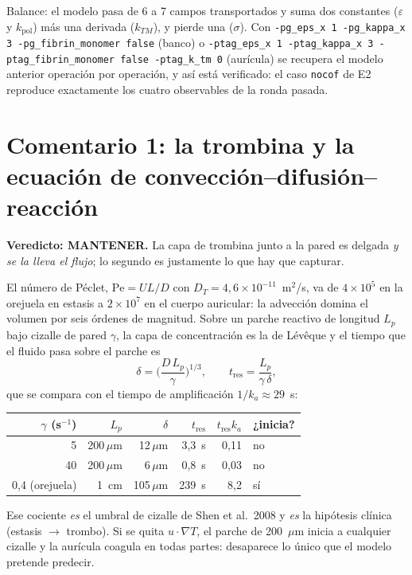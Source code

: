 \documentclass[11pt,a4paper]{article}
\newcommand{\MANT}{\textcolor{keep}{\textbf{MANTENER}}}
\begin{document}
\noindent
Balance: el modelo pasa de 6 a 7 campos transportados y suma dos constantes
($\varepsilon$ y $k_{\mathrm{pol}}$) más una derivada ($k_{TM}$), y pierde una
($\sigma$). Con
\verb|-pg_eps_x 1 -pg_kappa_x 3 -pg_fibrin_monomer false| (banco) o
\verb|-ptag_eps_x 1 -ptag_kappa_x 3 -ptag_fibrin_monomer false -ptag_k_tm 0|
(aurícula) se recupera el modelo anterior operación por operación, y así está
verificado: el caso \texttt{nocof} de E2 reproduce exactamente los cuatro
observables de la ronda pasada.

\section{Comentario 1: la trombina y la ecuación de convección--difusión--reacción}

\textbf{Veredicto: \MANT.} La capa de trombina junto a la pared es delgada
\emph{y se la lleva el flujo}; lo segundo es justamente lo que hay que capturar.

El número de Péclet, $\mathrm{Pe}=UL/D$ con $D_T=4{,}6\times10^{-11}$~m$^2$/s, va de
$4\times10^{5}$ en la orejuela en estasis a $2\times10^{7}$ en el cuerpo auricular:
la advección domina el volumen por seis órdenes de magnitud. Sobre un parche
reactivo de longitud $L_p$ bajo cizalle de pared $\gamma$, la capa de concentración
es la de Lévêque y el tiempo que el fluido pasa sobre el parche es
%
\begin{equation}
\delta=\Big(\frac{D\,L_p}{\gamma}\Big)^{1/3},
\qquad
t_{\mathrm{res}}=\frac{L_p}{\gamma\,\delta},
\end{equation}
%
que se compara con el tiempo de amplificación $1/k_a\approx29$~s:

\begin{center}
\small
\begin{tabular}{@{}rrrrrl@{}}
\toprule
$\gamma$ (s$^{-1}$) & $L_p$ & $\delta$ & $t_{\mathrm{res}}$ & $t_{\mathrm{res}}k_a$ & ¿inicia? \\
\midrule
5   & 200\,$\mu$m & 12\,$\mu$m  & 3{,}3~s  & 0{,}11 & no \\
40  & 200\,$\mu$m & 6\,$\mu$m   & 0{,}8~s  & 0{,}03 & no \\
0{,}4 (orejuela) & 1~cm & 105\,$\mu$m & 239~s & 8{,}2 & sí \\
\bottomrule
\end{tabular}
\end{center}

\noindent
Ese cociente \emph{es} el umbral de cizalle de Shen et al.~2008 y \emph{es} la
hipótesis clínica (estasis $\rightarrow$ trombo). Si se quita $u\cdot\nabla T$, el
parche de 200~$\mu$m inicia a cualquier cizalle y la aurícula coagula en todas
partes: desaparece lo único que el modelo pretende predecir.
\end{document}
